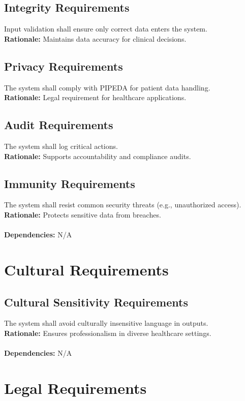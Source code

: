 \documentclass[12pt]{article}
\begin{document}
\subsection{Integrity Requirements}
Input validation shall ensure only correct data enters the system.  \\
\textbf{Rationale:} Maintains data accuracy for clinical decisions.

\subsection{Privacy Requirements}
The system shall comply with PIPEDA for patient data handling.  \\
\textbf{Rationale:} Legal requirement for healthcare applications.

\subsection{Audit Requirements}
The system shall log critical actions. \\ 
\textbf{Rationale:} Supports accountability and compliance audits.

\subsection{Immunity Requirements}
The system shall resist common security threats (e.g., unauthorized access).  \\
\textbf{Rationale:} Protects sensitive data from breaches. \\
  \\
\textbf{Dependencies:} N/A

\section{Cultural Requirements} \label{NFR_Cultural}
\subsection{Cultural Sensitivity Requirements}
The system shall avoid culturally insensitive language in outputs.  \\
\textbf{Rationale:} Ensures professionalism in diverse healthcare settings. \\
  \\
\textbf{Dependencies:} N/A

\section{Legal Requirements} \label{NFR_Legal}
\end{document}
